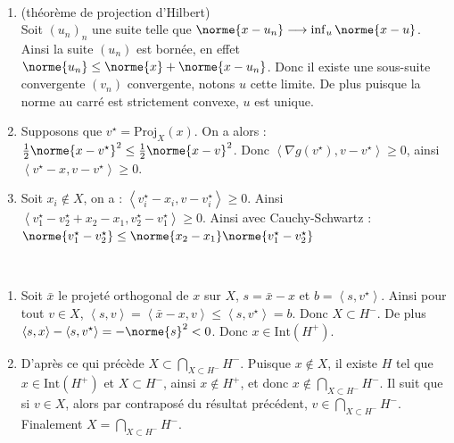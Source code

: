 \documentclass[12pt,a4paper]{article}
\begin{document}
	\begin{sol}
		$ $\\
		\begin{minipage}[t]{17cm}
			\begin{enumerate}
				\item (théorème de projection d'Hilbert)\\
				Soit $(u_n)_n$ une suite telle que $\norme{x-u_n} \longrightarrow \inf_u \norme{x-u}$. Ainsi la suite $(u_n)$ est bornée, en effet $\norme{u_n} \leq \norme{x}+\norme{x-u_n}$. Donc il existe une sous-suite convergente $(v_n)$ convergente, notons $u$ cette limite. De plus puisque la norme au carré est strictement convexe, $u$ est unique.
				
				\item Supposons que $v^\star = \mathrm{Proj}_X(x)$. On a alors : $ \frac12\norme{x-v^\star}^2 \leq \frac12\norme{x-v}^2 $. Donc $\left< \nabla g(v^\star),v-v^\star\right> \geq 0$, ainsi $\left<v^\star - x, v-v^\star\right> \geq 0$.
				
				\item Soit $x_i \not\in X$, on a : $\left<v_i^\star - x_i, v-v_i^\star\right> \geq 0$. Ainsi $\left<v_1^\star - v_2^\star + x_2 - x_1, v_2^\star-v_1^\star\right> \geq 0$. Ainsi avec Cauchy-Schwartz : $\norme{v_1^\star-v_2^\star} \leq \norme{x_2-x_1}\norme{v_1^\star-v_2^\star}$
			\end{enumerate}
		\end{minipage}
	\end{sol}
	
	\begin{sol}
		$ $\\
		\begin{minipage}[t]{17cm}
			\begin{enumerate}
				\item Soit $\bar x$ le projeté orthogonal de $x$ sur $X$, $s = \bar x-x$ et $b=\left< s,v^\star\right>$. Ainsi pour tout $ v \in X$, $\left<s,v\right> = \left< \bar x - x, v\right> \leq \left< s,v^\star\right> = b$. Donc $X \subset H^-$. De plus $ \left<s,x\right> - \left<s,v^\star\right> = -\norme{s}^2 < 0 $. Donc $x \in \mathrm{Int}(H^+)$.
				
				\item D'après ce qui précède $X \subset\bigcap_{X \subset H^-} H^-$. Puisque $x \not \in X$, il existe $H$ tel que $x \in  \mathrm{Int}(H^+)$ et $X \subset H^-$, ainsi $x \not \in H^+$, et donc $x \not \in \bigcap_{X \subset H^-} H^-$. Il suit que si $v \in X$, alors par contraposé du résultat précédent, $v \in \bigcap_{X \subset H^-} H^-$. Finalement $X = \bigcap_{X \subset H^-} H^-$.
			\end{enumerate}
		\end{minipage}
	\end{sol}
	
\end{document}

